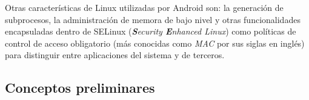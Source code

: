 Otras características de Linux utilizadas por Android son: la generación de subprocesos, la
administración de memora de bajo nivel y otras funcionalidades encapsuladas dentro de SELinux
(\textit{\textbf{S}ecurity \textbf{E}nhanced Linux}) como políticas de control de acceso obligatorio
(más conocidas como \textit{MAC} por sus siglas en inglés) para distinguir entre aplicaciones del
sistema y de terceros.

\subsection{Conceptos preliminares}